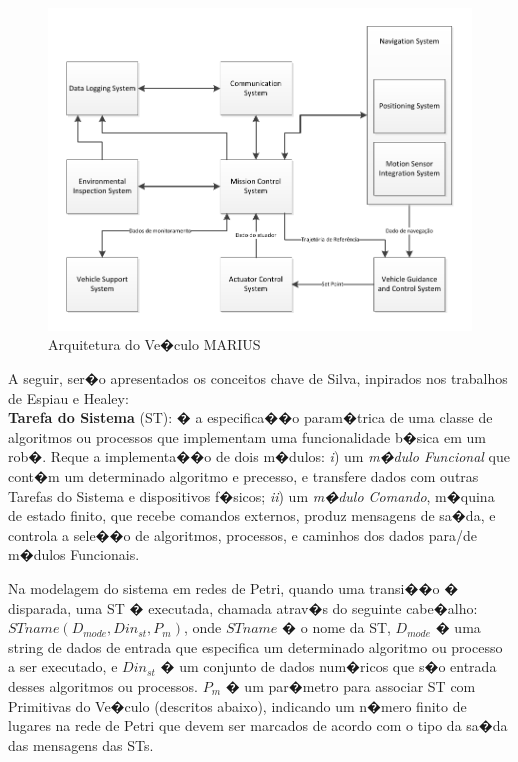 \begin{figure}[H]
\centering
\includegraphics[width=1\columnwidth]{figs/SILVA_1.pdf}
\caption{Arquitetura do Ve�culo MARIUS}
\label{SILVA_1}
\end{figure}

A seguir, ser�o apresentados os conceitos chave de Silva, inpirados nos
trabalhos de Espiau e Healey:\\

\textbf{Tarefa do Sistema} (ST): � a especifica��o param�trica de uma classe
de algoritmos ou processos que implementam uma funcionalidade b�sica em um rob�.
Reque a implementa��o de dois m�dulos: \textit{i}) um \emph{m�dulo Funcional}
que cont�m um determinado algoritmo e precesso, e transfere dados com outras
Tarefas do Sistema e dispositivos f�sicos; \textit{ii}) um \emph{m�dulo
Comando}, m�quina de estado finito, que recebe comandos externos, produz
mensagens de sa�da, e controla a sele��o de algoritmos, processos, e caminhos
dos dados para/de m�dulos Funcionais.

Na modelagem do sistema em redes de Petri, quando uma transi��o �
disparada, uma ST � executada, chamada atrav�s do seguinte cabe�alho:
$STname(D_{mode},Din_{st},P_m)$, onde $STname$ � o nome da ST, $D_{mode}$ � uma
string de dados de entrada que especifica um determinado algoritmo ou processo a
ser executado, e $Din_{st}$ � um conjunto de dados num�ricos que s�o entrada
desses algoritmos ou processos. $P_m$ � um par�metro para associar ST com
Primitivas do Ve�culo (descritos abaixo), indicando um n�mero finito de lugares
na rede de Petri que devem ser marcados de acordo com o tipo da sa�da das
mensagens das STs.

